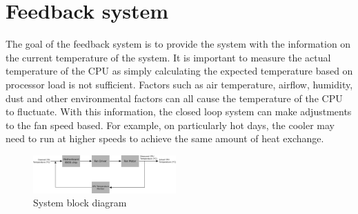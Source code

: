 \documentclass[conference]{IEEEtran}
\begin{document}
\section{Feedback system}
The goal of the feedback system is to provide the system with the information on the current temperature of the system. It is important to measure the actual temperature of the CPU as simply calculating the expected temperature based on processor load is not sufficient. Factors such as air temperature, airflow, humidity, dust and other environmental factors can all cause the temperature of the CPU to fluctuate. With this information, the closed loop system can make adjustments to the fan speed based. For example, on particularly hot days, the cooler may need to run at higher speeds to achieve the same amount of heat exchange. 
\begin{figure}[tbhp]
    \centering
    \includegraphics[width=0.489\textwidth]{../img/figure1.png}
    \caption{System block diagram}
\end{figure}
\end{document}
